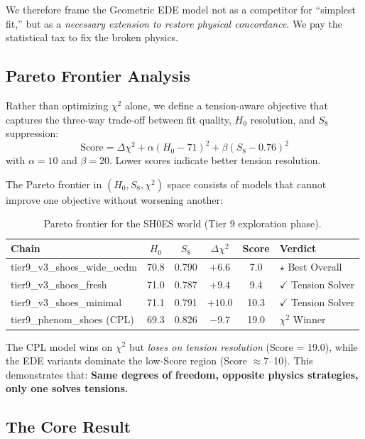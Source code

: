 We therefore frame the Geometric EDE model not as a competitor for ``simplest fit,'' but as a \emph{necessary extension to restore physical concordance}. We pay the statistical tax to fix the broken physics.

\subsection{Pareto Frontier Analysis}

Rather than optimizing $\chi^2$ alone, we define a tension-aware objective that captures the three-way trade-off between fit quality, $H_0$ resolution, and $S_8$ suppression:
\begin{equation}
    \text{Score} = \Delta\chi^2 + \alpha(H_0 - 71)^2 + \beta(S_8 - 0.76)^2
\end{equation}
with $\alpha = 10$ and $\beta = 20$. Lower scores indicate better tension resolution.

The Pareto frontier in $(H_0, S_8, \chi^2)$ space consists of models that cannot improve one objective without worsening another:

\begin{table}[h]
\centering
\caption{Pareto frontier for the SH0ES world (Tier 9 exploration phase).}
\label{tab:pareto}
\begin{tabular}{lccccl}
\hline\hline
Chain & $H_0$ & $S_8$ & $\Delta\chi^2$ & Score & Verdict \\
\hline
tier9\_v3\_shoes\_wide\_ocdm & 70.8 & 0.790 & $+6.6$ & 7.0 & $\star$ Best Overall \\
tier9\_v3\_shoes\_fresh & 71.0 & 0.787 & $+9.4$ & 9.4 & $\checkmark$ Tension Solver \\
tier9\_v3\_shoes\_minimal & 71.1 & 0.791 & $+10.0$ & 10.3 & $\checkmark$ Tension Solver \\
tier9\_phenom\_shoes (CPL) & 69.3 & 0.826 & $-9.7$ & 19.0 & $\chi^2$ Winner \\
\hline\hline
\end{tabular}
\end{table}

The CPL model wins on $\chi^2$ but \emph{loses on tension resolution} (Score = 19.0), while the EDE variants dominate the low-Score region (Score $\approx 7$--10). This demonstrates that: \textbf{Same degrees of freedom, opposite physics strategies, only one solves tensions.}

\subsection{The Core Result}

